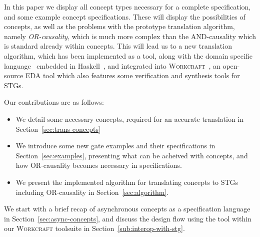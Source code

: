 \documentclass[british, journal]{IEEEtran}
\newcommand{\noun}[1]{\textsc{#1}}
\begin{document}
In this paper we display all concept types necessary for a complete specification, and some 
example concept specifications. These will display the possibilities of concepts, as well as the 
problems with the prototype translation algorithm, namely \emph{OR-causality}, which is 
much more complex than the AND-causality which is standard already within concepts. 
This will lead us to a new translation algorithm, which has been implemented as a tool, 
along with the domain specific language~\cite{2016_concepts_github} embedded in 
Haskell~\cite{1996_hudak_dsl}, and integrated into 
\noun{Workcraft}~\cite{Workcraft_website}, an open-source EDA tool which also 
features some verification and synthesis tools for STGs. 

Our contributions are as follows:
\begin{itemize}
  \item We detail some necessary concepts, required for an accurate 
  translation in Section~\ref{sec:trans-concepts}
  \item We introduce some new gate examples and their specifications in
  Section~\ref{sec:examples}, presenting what can be acheived with
  concepts, and how OR-causality becomes necessary in specifications.
  \item We present the implemented algorithm for translating concepts to STGs
  including OR-causality in Section~\ref{sec:algorithm}.
\end{itemize}

\noindent
We start with a brief recap of asynchronous concepts as a specification language in
Section~\ref{sec:async-concepts}, and discuss the design flow using the tool within our
\noun{Workcraft} toolsuite in Section~\ref{sub:interop-with-stg}.

\end{document}
